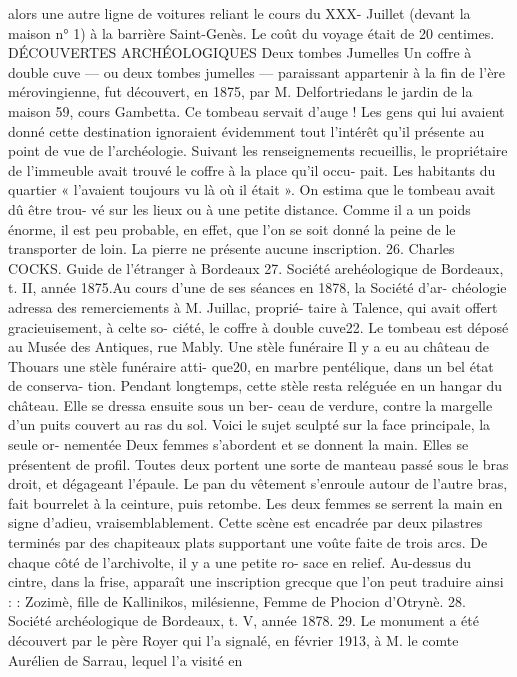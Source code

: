 \documentclass[a4paper,11pt]{book}
\begin{document}
alors une autre ligne de voitures reliant le cours du XXX-
Juillet (devant la maison n° 1) à la barrière Saint-Genès.
Le coût du voyage était de 20 centimes.
DÉCOUVERTES ARCHÉOLOGIQUES
Deux tombes Jumelles
Un coffre à double cuve — ou deux tombes jumelles —
paraissant appartenir à la fin de l'ère mérovingienne, fut
découvert, en 1875, par M. Delfortriedans le jardin de
la maison 59, cours Gambetta. Ce tombeau servait d'auge !
Les gens qui lui avaient donné cette destination ignoraient
évidemment tout l'intérêt qu'il présente au point de vue
de l'archéologie.
Suivant les renseignements recueillis, le propriétaire
de l'immeuble avait trouvé le coffre à la place qu'il occu-
pait. Les habitants du quartier « l'avaient toujours vu là
où il était ». On estima que le tombeau avait dû être trou-
vé sur les lieux ou à une petite distance. Comme il a un
poids énorme, il est peu probable, en effet, que l'on se
soit donné la peine de le transporter de loin. La pierre ne
présente aucune inscription.
26. Charles COCKS. Guide de l'étranger à Bordeaux
27. Société arehéologique de Bordeaux, t. II, année 1875.Au cours d'une de ses séances en 1878, la Société d'ar-
chéologie adressa des remerciements à M. Juillac, proprié-
taire à Talence, qui avait offert gracieuisement, à celte so-
ciété, le coffre à double cuve22.
Le tombeau est déposé au Musée des Antiques, rue
Mably.
Une stèle funéraire
Il y a eu au château de Thouars une stèle funéraire atti-
que20, en marbre pentélique, dans un bel état de conserva-
tion. Pendant longtemps, cette stèle resta reléguée en un
hangar du château. Elle se dressa ensuite sous un ber-
ceau de verdure, contre la margelle d'un puits couvert au
ras du sol.
Voici le sujet sculpté sur la face principale, la seule or-
nementée
Deux femmes s'abordent et se donnent la main. Elles
se présentent de profil. Toutes deux portent une sorte
de manteau passé sous le bras droit, et dégageant l'épaule.
Le pan du vêtement s'enroule autour de l'autre bras, fait
bourrelet à la ceinture, puis retombe.
Les deux femmes se serrent la main en signe d'adieu,
vraisemblablement.
Cette scène est encadrée par deux pilastres terminés par
des chapiteaux plats supportant une voûte faite de trois
arcs. De chaque côté de l'archivolte, il y a une petite ro-
sace en relief.
Au-dessus du cintre, dans la frise, apparaît une inscription
grecque que l'on peut traduire ainsi :
:
Zozimè, fille de Kallinikos, milésienne,
Femme de Phocion d'Otrynè.
28. Société archéologique de Bordeaux, t. V, année 1878.
29. Le monument a été découvert par le père Royer qui l'a signalé,
en février 1913, à M. le comte Aurélien de Sarrau, lequel l'a visité en
\end{document}
